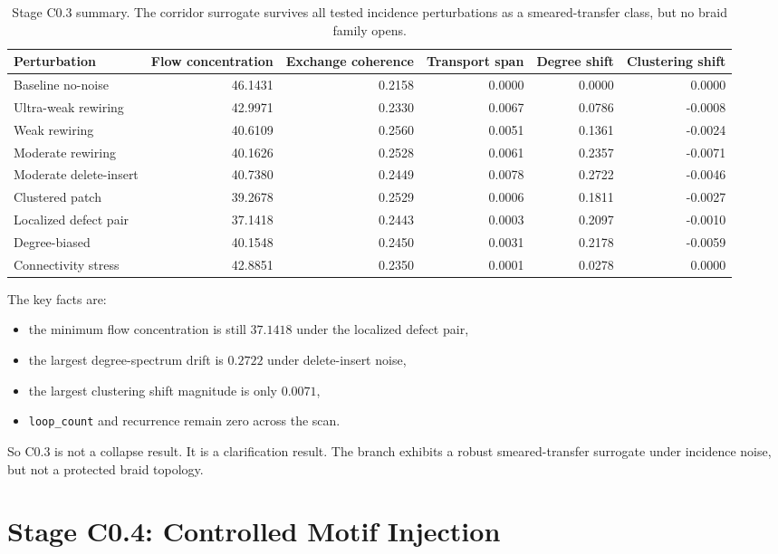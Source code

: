 \documentclass[11pt]{article}
\begin{document}
\begin{table}[t]
\centering
\scriptsize
\begin{tabular}{@{}lrrrrr@{}}
\toprule
Perturbation & Flow concentration & Exchange coherence & Transport span & Degree shift & Clustering shift \\
\midrule
Baseline no-noise & 46.1431 & 0.2158 & 0.0000 & 0.0000 & 0.0000 \\
Ultra-weak rewiring & 42.9971 & 0.2330 & 0.0067 & 0.0786 & -0.0008 \\
Weak rewiring & 40.6109 & 0.2560 & 0.0051 & 0.1361 & -0.0024 \\
Moderate rewiring & 40.1626 & 0.2528 & 0.0061 & 0.2357 & -0.0071 \\
Moderate delete-insert & 40.7380 & 0.2449 & 0.0078 & 0.2722 & -0.0046 \\
Clustered patch & 39.2678 & 0.2529 & 0.0006 & 0.1811 & -0.0027 \\
Localized defect pair & 37.1418 & 0.2443 & 0.0003 & 0.2097 & -0.0010 \\
Degree-biased & 40.1548 & 0.2450 & 0.0031 & 0.2178 & -0.0059 \\
Connectivity stress & 42.8851 & 0.2350 & 0.0001 & 0.0278 & 0.0000 \\
\bottomrule
\end{tabular}
\caption{Stage C0.3 summary. The corridor surrogate survives all tested incidence perturbations as a smeared-transfer class, but no braid family opens.}
\label{tab:c03}
\end{table}

The key facts are:
\begin{itemize}
\item the minimum flow concentration is still $37.1418$ under the localized defect pair,
\item the largest degree-spectrum drift is $0.2722$ under delete-insert noise,
\item the largest clustering shift magnitude is only $0.0071$,
\item \texttt{loop\_count} and recurrence remain zero across the scan.
\end{itemize}

So C0.3 is not a collapse result. It is a clarification result. The branch exhibits a robust smeared-transfer surrogate under incidence noise, but not a protected braid topology.

\section{Stage C0.4: Controlled Motif Injection}
\end{document}

